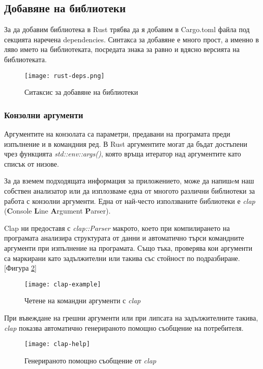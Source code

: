 \subsection{Добавяне на библиотеки}
За да добавим библиотека в Rust трябва да я добавим в Cargo.toml файла под
секцията наречена dependencies. Синтакса за добавяне е много прост, а именно в
ляво името на библиотеката, посредата знака за равно и вдясно версията на
библиотеката.
\begin{figure}[!htb]
  \texttt{[image: rust-deps.png]}
  \centering
  \caption{Ситаксис за добавяне на библиотеки}
  \label{fig:rust-deps}
\end{figure}

\subsubsection{Конзолни аргументи}
Аргументите на конзолата са параметри, предавани на програмата преди изпълнение
и в командния ред. В Rust аргументите могат да бъдат достъпени чрез
функцията \textit{std::env::args()}, която връща итератор над аргументите като списък от
низове.

За да вземем подходящата информация за приложението, може да напишeм наш собствен
анализатор или да изплозваме една от многото различни библиотеки за работа с
конзолни аргументи. Една от най-често използваните библиотеки е \textit{clap} (\textbf{C}onsole \textbf{L}ine
\textbf{A}rgument \textbf{P}arser).

Clap ни предоставя с \textit{clap::Parser} макрото, което при компилирането на програмата
анализира структурата от данни и автоматично търси командните аргументи при
изпълнение на програмата. Също тъка, проверява кои аргументи са маркирани като
задължителни или такива със стойност по подразбиране. [Фигура \ref{fig:clap-example}]
\begin{figure}[!htb]
  \texttt{[image: clap-example]}
  \centering
  \caption{Четене на командни аргументи с \textit{clap}}
  \label{fig:clap-example}
\end{figure}

При въвеждане на грешни аргументи или при липсата на задължителните такива, \textit{clap}
показва автоматично генерираното помощно съобщение на потребителя.
\begin{figure}[!htb]
  \texttt{[image: clap-help]}
  \centering
  \caption{Генерираното помощно съобщение от \textit{clap}}
  \label{fig:clap-help}
\end{figure}

